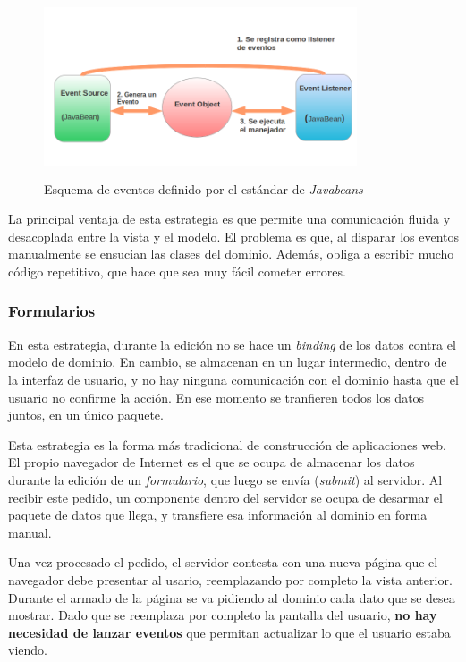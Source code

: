 	
	 \begin{figure}[h]
		\includegraphics[width=350px, height=200px]{img/javabeans}
		\caption{Esquema de eventos definido por el estándar de \emph{Javabeans}}
		\label{javabeans}
	\end{figure}

	La principal ventaja de esta estrategia es que
	permite una comunicación fluida y desacoplada entre la vista y el modelo.
	El problema es que, al disparar los eventos \\
	manualmente se ensucian las
	clases del dominio. Además, obliga a escribir mucho código repetitivo, que hace que
	sea muy fácil cometer errores.

\subsubsection{Formularios}

	En esta estrategia, durante la edición no se hace un \emph{binding} de los
	datos contra el modelo de dominio. En cambio, se almacenan en un lugar
	intermedio, dentro de la interfaz de usuario, y no hay ninguna comunicación
	con el dominio hasta que el usuario no confirme la acción. En ese momento se
	tranfieren todos los datos juntos, en un único paquete.
	
	Esta estrategia es la forma más tradicional de construcción de aplicaciones
	web. El propio navegador de Internet es el que se ocupa de almacenar los
	datos durante la edición de un \emph{formulario}, que luego se envía
	(\emph{submit}) al servidor. 
	Al recibir este pedido, un componente dentro del servidor se ocupa de desarmar
	el paquete de datos que llega, y transfiere esa información al dominio en forma
	manual.
	
	Una vez procesado el pedido, el servidor contesta con una nueva página que
	el \\ navegador debe presentar al usario, reemplazando por completo la vista
	anterior.\\
	Durante el armado de la página se va pidiendo al dominio cada dato que se desea
	mostrar. Dado que se reemplaza por completo la pantalla del usuario, \textbf{no
	hay necesidad de lanzar eventos} que permitan actualizar lo que el usuario
	estaba viendo.
	
